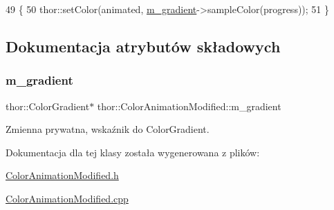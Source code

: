 \begin{DoxyCode}
49     \{
50         thor::setColor(animated, \mbox{\hyperlink{classthor_1_1_color_animation_modified_abf68739bcf2c9d31b3165a82e0e617c7}{m\_gradient}}->sampleColor(progress));
51     \}
\end{DoxyCode}


\subsection{Dokumentacja atrybutów składowych}
\mbox{\label{classthor_1_1_color_animation_modified_abf68739bcf2c9d31b3165a82e0e617c7}} 
\subsubsection{\texorpdfstring{m\+\_\+gradient}{m\_gradient}}
{\footnotesize\ttfamily thor\+::\+Color\+Gradient$\ast$ thor\+::\+Color\+Animation\+Modified\+::m\+\_\+gradient\hspace{0.3cm}{\ttfamily [private]}}

Zmienna prywatna, wskaźnik do Color\+Gradient. 

Dokumentacja dla tej klasy została wygenerowana z plików\+:\begin{DoxyCompactItemize}
\item 
\mbox{\hyperlink{_color_animation_modified_8h}{Color\+Animation\+Modified.\+h}}\item 
\mbox{\hyperlink{_color_animation_modified_8cpp}{Color\+Animation\+Modified.\+cpp}}\end{DoxyCompactItemize}

